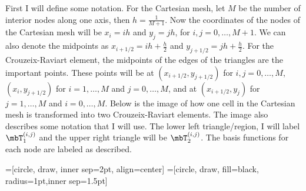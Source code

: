 \documentclass[11pt, titlepage]{article}
\begin{document}
\begin{enumerate}
\begin{enumerate}
        First I will define some notation.
        For the Cartesian mesh, let $M$ be the number of interior nodes along
        one axis, then $h = \frac{1}{M+1}$.
        Now the coordinates of the nodes of the Cartesian mesh will be
        $x_i = ih$ and $y_j = jh$, for $i, j = 0, \ldots, M+1$.
        We can also denote the midpoints as $x_{i+1/2} = ih + \frac{h}{2}$ and $y_{j+1/2} = jh + \frac{h}{2}$.
        For the Crouzeix-Raviart element, the midpoints of the edges of the
        triangles are the important points.
        These points will be at $(x_{i+1/2}, y_{j+1/2})$ for $i, j = 0, \ldots, M$,
        $(x_i, y_{j+1/2})$ for $i = 1, \ldots, M$ and $j = 0, \ldots, M$, and at
        $(x_{i+1/2}, y_{j})$ for $j = 1, \ldots, M$ and $i = 0, \ldots, M$.
        Below is the image of how one cell in the Cartesian mesh is transformed
        into two Crouzeix-Raviart elements.
        The image also describes some notation that I will use.
        The lower left triangle/region, I will label $\mbT^{(i, j)}_1$ and the upper
        right triangle will be $\mbT^{(i, j)}_2$.
        The basis functions for each node are labeled as described.

        =[circle, draw, inner sep=2pt, align=center]
        =[circle, draw, fill=black, radius=1pt,inner sep=1.5pt]
        \begin{center}
        \end{center}


\end{enumerate}
\end{enumerate}
\end{document}
